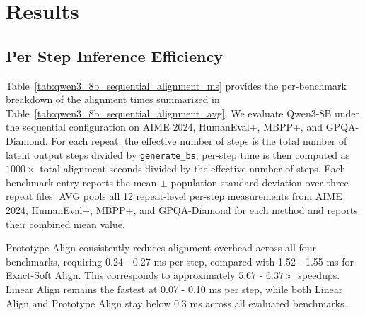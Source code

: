 \documentclass[11pt]{article}
\begin{document}
\section{Results}
\label{app:results}

\subsection{Per Step Inference Efficiency}
\label{app:per_step_efficiency}
Table~\ref{tab:qwen3_8b_sequential_alignment_ms} provides the per-benchmark breakdown of the alignment times summarized in Table~\ref{tab:qwen3_8b_sequential_alignment_avg}. We evaluate Qwen3-8B under the sequential configuration on AIME 2024, HumanEval+, MBPP+, and GPQA-Diamond. For each repeat, the effective number of steps is the total number of latent output steps divided by \texttt{generate\_bs}; per-step time is then computed as $1000\times$ total alignment seconds divided by the effective number of steps. Each benchmark entry reports the mean $\pm$ population standard deviation over three repeat files. AVG pools all 12 repeat-level per-step measurements from AIME 2024, HumanEval+, MBPP+, and GPQA-Diamond for each method and reports their combined mean value.


Prototype Align consistently reduces alignment overhead across all four benchmarks, requiring 0.24 - 0.27 ms per step, compared with 1.52 - 1.55 ms for Exact-Soft Align. This corresponds to approximately $5.67$ - $6.37\times$ speedups. Linear Align remains the fastest at 0.07 - 0.10 ms per step, while both Linear Align and Prototype Align stay below 0.3 ms across all evaluated benchmarks.
\end{document}
